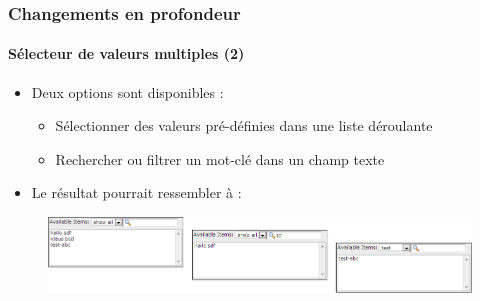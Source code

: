 \begin{frame}[fragile]
	\frametitle{Changements en profondeur}
	\framesubtitle{Sélecteur de valeurs multiples (2)}

	\begin{itemize}
		\item Deux options sont disponibles :

			\begin{itemize}
				\item Sélectionner des valeurs pré-définies dans une liste déroulante
				\item Rechercher ou filtrer un mot-clé dans un champ texte
			\end{itemize}

		\item Le résultat pourrait ressembler à :
	\end{itemize}

	\begin{figure}
		\includegraphics[width=1\linewidth]{Images/InDepthChanges/MultipleValueSelector.png}
	\end{figure}

\end{frame}


